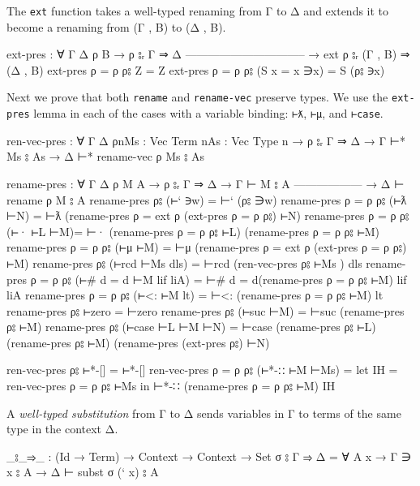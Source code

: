 The \texttt{ext} function takes a well-typed renaming from Γ to Δ and
extends it to become a renaming from (Γ , B) to (Δ , B).

\begin{fence}
\begin{code}
ext-pres : ∀ {Γ Δ ρ B}
  → ρ ⦂ᵣ Γ ⇒ Δ
    --------------------------------
  → ext ρ ⦂ᵣ (Γ , B) ⇒ (Δ , B)
ext-pres {ρ = ρ } ρ⦂ Z = Z
ext-pres {ρ = ρ } ρ⦂ (S {x = x} ∋x) =  S (ρ⦂ ∋x)
\end{code}
\end{fence}

Next we prove that both \texttt{rename} and \texttt{rename-vec} preserve
types. We use the \texttt{ext-pres} lemma in each of the cases with a
variable binding: \texttt{⊢ƛ}, \texttt{⊢μ}, and \texttt{⊢case}.

\begin{fence}
\begin{code}
ren-vec-pres : ∀ {Γ Δ ρ}{n}{Ms : Vec Term n}{As : Vec Type n}
  → ρ ⦂ᵣ Γ ⇒ Δ  →  Γ ⊢* Ms ⦂ As  →  Δ ⊢* rename-vec ρ Ms ⦂ As

rename-pres : ∀ {Γ Δ ρ M A}
  → ρ ⦂ᵣ Γ ⇒ Δ
  → Γ ⊢ M ⦂ A
    ------------------
  → Δ ⊢ rename ρ M ⦂ A
rename-pres ρ⦂ (⊢` ∋w)           =  ⊢` (ρ⦂ ∋w)
rename-pres {ρ = ρ} ρ⦂ (⊢ƛ ⊢N)   =  ⊢ƛ (rename-pres {ρ = ext ρ} (ext-pres {ρ = ρ} ρ⦂) ⊢N)
rename-pres {ρ = ρ} ρ⦂ (⊢· ⊢L ⊢M)=  ⊢· (rename-pres {ρ = ρ} ρ⦂ ⊢L) (rename-pres {ρ = ρ} ρ⦂ ⊢M)
rename-pres {ρ = ρ} ρ⦂ (⊢μ ⊢M)   =  ⊢μ (rename-pres {ρ = ext ρ} (ext-pres {ρ = ρ} ρ⦂) ⊢M)
rename-pres ρ⦂ (⊢rcd ⊢Ms dls)    = ⊢rcd (ren-vec-pres ρ⦂ ⊢Ms ) dls
rename-pres {ρ = ρ} ρ⦂ (⊢# {d = d} ⊢M lif liA) = ⊢# {d = d}(rename-pres {ρ = ρ} ρ⦂ ⊢M) lif liA
rename-pres {ρ = ρ} ρ⦂ (⊢<: ⊢M lt) = ⊢<: (rename-pres {ρ = ρ} ρ⦂ ⊢M) lt
rename-pres ρ⦂ ⊢zero               = ⊢zero
rename-pres ρ⦂ (⊢suc ⊢M)           = ⊢suc (rename-pres ρ⦂ ⊢M)
rename-pres ρ⦂ (⊢case ⊢L ⊢M ⊢N)    =
    ⊢case (rename-pres ρ⦂ ⊢L) (rename-pres ρ⦂ ⊢M) (rename-pres (ext-pres ρ⦂) ⊢N)

ren-vec-pres ρ⦂ ⊢*-[] = ⊢*-[]
ren-vec-pres {ρ = ρ} ρ⦂ (⊢*-∷ ⊢M ⊢Ms) =
  let IH = ren-vec-pres {ρ = ρ} ρ⦂ ⊢Ms in
  ⊢*-∷ (rename-pres {ρ = ρ} ρ⦂ ⊢M) IH
\end{code}
\end{fence}

A \emph{well-typed substitution} from Γ to Δ sends variables in Γ to
terms of the same type in the context Δ.

\begin{fence}
\begin{code}
_⦂_⇒_ : (Id → Term) → Context → Context → Set
σ ⦂ Γ ⇒ Δ = ∀ {A x} → Γ ∋ x ⦂ A → Δ ⊢ subst σ (` x) ⦂ A
\end{code}
\end{fence}

